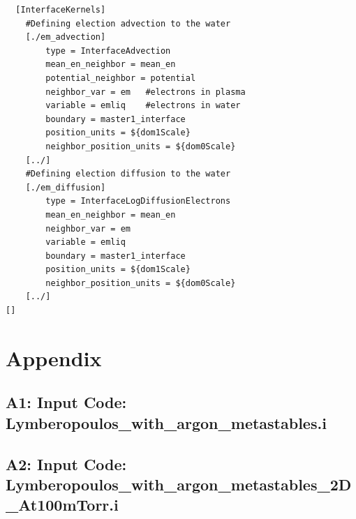 \documentclass[final]{report}
\begin{document}
  \begin{verbatim}
  [InterfaceKernels]
    #Defining election advection to the water
    [./em_advection]
        type = InterfaceAdvection
        mean_en_neighbor = mean_en
        potential_neighbor = potential
        neighbor_var = em   #electrons in plasma
        variable = emliq    #electrons in water
        boundary = master1_interface
        position_units = ${dom1Scale}
        neighbor_position_units = ${dom0Scale}
    [../]
    #Defining election diffusion to the water
    [./em_diffusion]
        type = InterfaceLogDiffusionElectrons
        mean_en_neighbor = mean_en
        neighbor_var = em
        variable = emliq
        boundary = master1_interface
        position_units = ${dom1Scale}
        neighbor_position_units = ${dom0Scale}
    [../]
[]
  \end{verbatim}

  \chapter{Appendix} \label{appendix}
  \section*{A1: Input Code: Lymberopoulos\_with\_argon\_metastables.i}
  
  \section*{A2: Input Code:\\
  Lymberopoulos\_with\_argon\_metastables\_2D\_At100mTorr.i}
  

\end{document}
